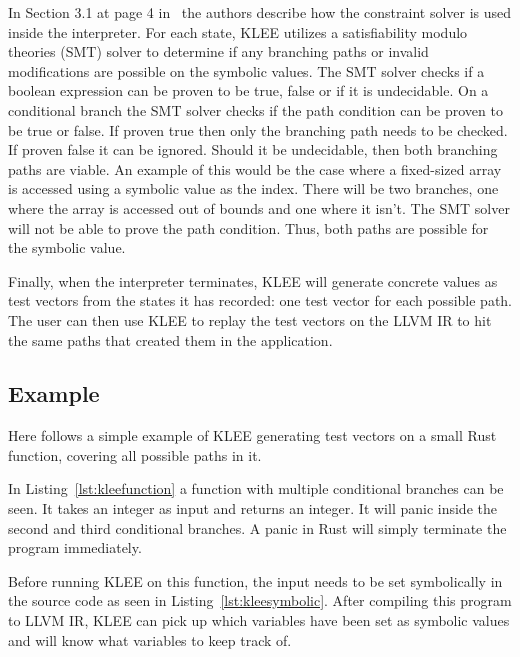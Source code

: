 In Section 3.1 at page 4 in~\cite{kleepaper} the authors describe how the
constraint solver is used inside the interpreter. For each state, KLEE utilizes
a satisfiability modulo theories (SMT) solver to determine if any branching
paths or invalid modifications are possible on the symbolic values. The SMT
solver checks if a boolean expression can be proven to be true, false or if it
is undecidable. On a conditional branch the SMT solver checks if the path
condition can be proven to be true or false. If proven true then only the
branching path needs to be checked. If proven false it can be ignored. Should
it be undecidable, then both branching paths are viable. An example of this
would be the case where a fixed-sized array is accessed using a symbolic value
as the index. There will be two branches, one where the array is accessed out
of bounds and one where it isn't. The SMT solver will not be able to prove the
path condition. Thus, both paths are possible for the symbolic value.

Finally, when the interpreter terminates, KLEE will generate concrete values as
test vectors from the states it has recorded: one test vector for each possible
path. The user can then use KLEE to replay the test vectors on the LLVM IR to hit
the same paths that created them in the application.

\subsection{Example}
Here follows a simple example of KLEE generating test vectors on a small Rust
function, covering all possible paths in it.

In Listing~\ref{lst:kleefunction} a function with multiple conditional branches
can be seen. It takes an integer as input and returns an integer. It will
panic inside the second and third conditional branches. A panic in Rust will
simply terminate the program immediately.


Before running KLEE on this function, the input needs to be set symbolically in
the source code as seen in Listing~\ref{lst:kleesymbolic}. After compiling this
program to LLVM IR, KLEE can pick up which variables have been set as symbolic
values and will know what variables to keep track of.



